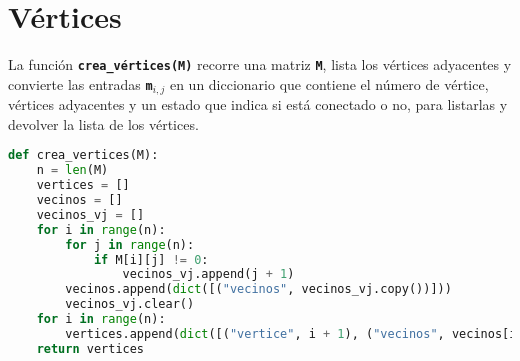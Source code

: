 \section{Vértices}
La función \texttt{\textbf{crea\_vértices(M)}} recorre una matriz \texttt{\textbf{M}}, lista los vértices adyacentes y convierte las entradas \texttt{\textbf{m$_{i,j}$}} en un diccionario que contiene el número de vértice, vértices adyacentes y un estado que indica si está conectado o no, para listarlas y devolver la lista de los vértices.
\begin{lstlisting}[language=python, caption=Función crea\_vértices(M)]
def crea_vertices(M):
    n = len(M)
    vertices = []
    vecinos = []
    vecinos_vj = []
    for i in range(n):
        for j in range(n):
            if M[i][j] != 0:
                vecinos_vj.append(j + 1)
        vecinos.append(dict([("vecinos", vecinos_vj.copy())]))
        vecinos_vj.clear()
    for i in range(n):
        vertices.append(dict([("vertice", i + 1), ("vecinos", vecinos[i]), ("conectado", False)]))
    return vertices
\end{lstlisting}